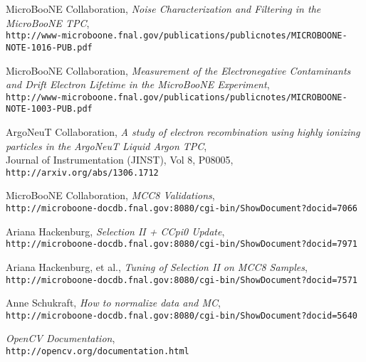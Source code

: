 \documentclass[12pt]{article}
\begin{document}
\begin{thebibliography}{9}
  MicroBooNE Collaboration, \emph{Noise Characterization and Filtering in the MicroBooNE TPC},\\
  \texttt{http://www-microboone.fnal.gov/publications/publicnotes/MICROBOONE-NOTE-1016-PUB.pdf}

  MicroBooNE Collaboration, \emph{Measurement of the Electronegative Contaminants and Drift Electron Lifetime in the MicroBooNE Experiment},\\
  \texttt{http://www-microboone.fnal.gov/publications/publicnotes/MICROBOONE-NOTE-1003-PUB.pdf}

  ArgoNeuT Collaboration, \emph{A study of electron recombination using highly ionizing particles in the ArgoNeuT Liquid Argon TPC},\\
  Journal of Instrumentation (JINST), Vol 8, P08005, \texttt{http://arxiv.org/abs/1306.1712}

 MicroBooNE Collaboration, \emph{MCC8 Validations},\\
 \texttt{http://microboone-docdb.fnal.gov:8080/cgi-bin/ShowDocument?docid=7066}

 Ariana Hackenburg, \emph{Selection II + CCpi0 Update},\\
 \texttt{http://microboone-docdb.fnal.gov:8080/cgi-bin/ShowDocument?docid=7971}

 Ariana Hackenburg, et al., \emph{Tuning of Selection II on MCC8 Samples},\\
 \texttt{http://microboone-docdb.fnal.gov:8080/cgi-bin/ShowDocument?docid=7571}

 Anne Schukraft, \emph{How to normalize data and MC},\\
 \texttt{http://microboone-docdb.fnal.gov:8080/cgi-bin/ShowDocument?docid=5640}

  \emph{OpenCV Documentation},\\
  \texttt{http://opencv.org/documentation.html}



\end{thebibliography}
\end{document}
